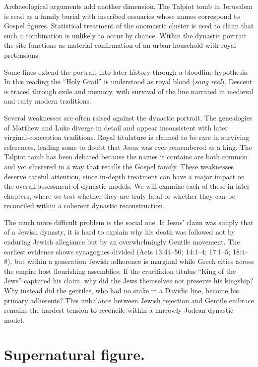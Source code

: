 Archaeological arguments add another dimension.
The Talpiot tomb in Jerusalem is read as a family burial with inscribed ossuaries whose names correspond to Gospel figures.
Statistical treatment of the onomastic cluster is used to claim that such a combination is unlikely to occur by chance.
Within the dynastic portrait the site functions as material confirmation of an urban household with royal pretensions.

Some lines extend the portrait into later history through a bloodline hypothesis.
In this reading the ``Holy Grail'' is understood as royal blood (\emph{sang real}).
Descent is traced through exile and memory, with survival of the line narrated in medieval and early modern traditions.

Several weaknesses are often raised against the dynastic portrait.
The genealogies of Matthew and Luke diverge in detail and appear inconsistent with later virginal-conception traditions.
Royal titulature is claimed to be rare in surviving references, leading some to doubt that Jesus was ever remembered as a king.
The Talpiot tomb has been debated because the names it contains are both common and yet clustered in a way that recalls the Gospel family.
These weaknesses deserve careful attention, since in-depth treatment can have a major impact on the overall assessment of dynastic models.
We will examine each of these in later chapters, where we test whether they are truly fatal or whether they can be reconciled within a coherent dynastic reconstruction.

The much more difficult problem is the social one.
If Jesus’ claim was simply that of a Jewish dynasty, it is hard to explain why his death was followed not by enduring Jewish allegiance but by an overwhelmingly Gentile movement.
The earliest evidence shows synagogues divided (Acts 13:44--50; 14:1--4; 17:1--5; 18:4--8), but within a generation Jewish adherence is marginal while Greek cities across the empire host flourishing assemblies.
If the crucifixion titulus “King of the Jews” captured his claim, why did the Jews themselves not preserve his kingship?
Why instead did the gentiles, who had no stake in a Davidic line, become his primary adherents?
This imbalance between Jewish rejection and Gentile embrace remains the hardest tension to reconcile within a narrowly Judean dynastic model.

\section{Supernatural figure.}\label{sec:supernatural}

